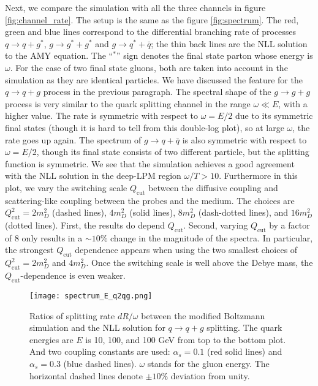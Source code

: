 Next, we compare the simulation with all the three channels in figure \ref{fig:channel_rate}.
The setup is the same as the figure \ref{fig:spectrum}.
The red, green and blue lines correspond to the differential branching rate of processes $q\rightarrow q+g^*$, $g\rightarrow g^*+g^*$ and $g\rightarrow q^*+\bar{q}$; the thin back lines are the NLL solution to the AMY equation.
The ``${}^*$'' sign denotes the final state parton whose energy is $\omega$.
For the case of two final state gluons, both are taken into account in the simulation as they are identical particles.
We have discussed the feature for the $q\rightarrow q+g$ process in the previous paragraph. 
The spectral shape of the $g\rightarrow g+g$ process is very similar to the quark splitting channel in the range $\omega \ll E$, with a higher value.
The rate is symmetric with respect to $\omega = E/2$ due to its symmetric final states (though it is hard to tell from this double-log plot), so at large $\omega$, the rate goes up again.
The spectrum of $g\rightarrow q+\bar{q}$ is also symmetric with respect to $\omega = E/2$, though its final state consists of two different particle, but the splitting function is symmetric.
We see that the simulation achieves a good agreement with the NLL solution in the deep-LPM region $\omega/T > 10$.
Furthermore in this plot, we vary the switching scale $Q_{\textrm{cut}}$ between the diffusive coupling and scattering-like coupling between the probes and the medium.
The choices are $Q_{\textrm{cut}}^2 = 2 m_D^2$ (dashed lines), $4 m_D^2$ (solid lines), $8 m_D^2$ (dash-dotted lines), and $16 m_D^2$ (dotted lines).
First, the results do depend $Q_{\textrm{cut}}$.
Second, varying $Q_{\textrm{cut}}$ by a factor of $8$ only results in a $\sim 10 \%$ change in the magnitude of the spectra.
In particular, the strongest $Q_{\textrm{cut}}$ dependence appears when using the two smallest choices of  $Q_{\textrm{cut}}^2 = 2 m_D^2$ and $4 m_D^2$.
Once the switching scale is well above the Debye mass, the $Q_{\textrm{cut}}$-dependence is even weaker.

\begin{figure}
\singlespacing
\centering
\texttt{[image: spectrum\_E\_q2qg.png]}
\caption[Ratios of splitting rate $dR/\omega$ between the modified Boltzmann]{Ratios of splitting rate $dR/\omega$ between the modified Boltzmann simulation and the NLL solution for $q\rightarrow q+g$ splitting. The quark energies are $E$ is 10, 100, and 100 GeV from top to the bottom plot. 
And two coupling constants are used: $\alpha_s = 0.1$ (red solid lines) and $\alpha_s = 0.3$ (blue dashed lines).
$\omega$ stands for the gluon energy.
The horizontal dashed lines denote $\pm 10\%$ deviation from unity. }
\label{fig:sys-q2qg}
\end{figure}

